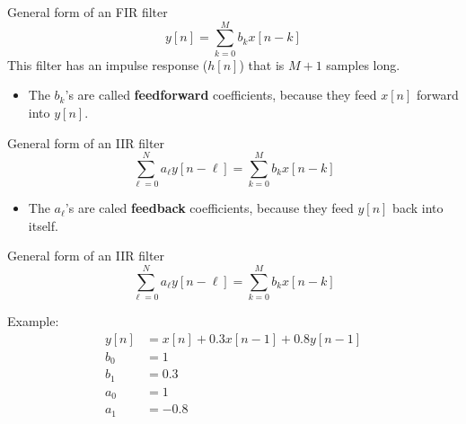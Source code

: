 \documentclass{beamer}
\begin{document}
\begin{frame}
  \begin{block}{General form of an FIR filter}
    \[
    y[n] = \sum_{k=0}^{M} b_k x[n-k]
    \]
    This filter has an impulse response ($h[n]$) that is $M+1$ samples
    long.
    \begin{itemize}
    \item The $b_k$'s are called {\bf feedforward}
      coefficients, because they feed $x[n]$ forward into $y[n]$.
    \end{itemize}
  \end{block}
  \begin{block}{General form of an IIR filter}
    \[
    \sum_{\ell=0}^N a_\ell y[n-\ell] = \sum_{k=0}^{M} b_k x[n-k]
    \]
    \begin{itemize}
    \item %
      The $a_\ell$'s are caled
      {\bf feedback} coefficients, because they feed $y[n]$ back into
      itself.
    \end{itemize}
  \end{block}
\end{frame}

\begin{frame}
  \begin{block}{General form of an IIR filter}
    \[
    \sum_{\ell=0}^N a_\ell y[n-\ell] = \sum_{k=0}^{M} b_k x[n-k]
    \]
  \end{block}
  Example:
  \begin{align*}
    y[n] &= x[n] + 0.3 x[n-1] +  0.8 y[n-1]\\
    b_0 &= 1\\
    b_1 &= 0.3\\
    a_0 &= 1\\
    a_1 &= -0.8
  \end{align*}
\end{frame}
\end{document}
